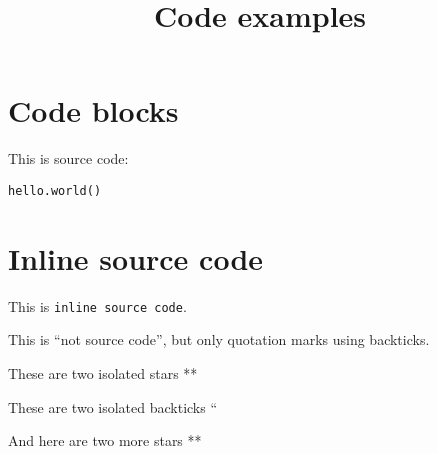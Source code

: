 \documentclass{article}
\begin{document}
\title{Code examples}
\author{}
\maketitle

\section{Code blocks}

This is source code:


\begin{verbatim}
hello.world()
\end{verbatim}


\section{Inline source code}

This is \texttt{inline source code}.

This is ``not source code'', but only quotation marks using backticks.

These are two isolated stars **

These are two isolated backticks ``

And here are two more stars **
\end{document}
